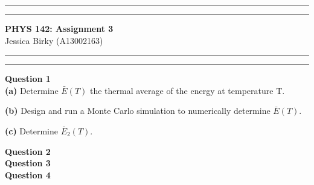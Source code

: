 \documentclass{article}
\newcommand{\mytitle}{PHYS 142: Assignment 3}
\begin{document}
\hrule \vspace{1pt} \hrule 
\begin{center}\Large \textbf{\sc \mytitle} \\
\normalsize \sc Jessica Birky (A13002163)
\end{center}
\hrule \vspace{1pt} \hrule 


\bigskip
\textbf{Question 1} \\

\textbf{(a)} Determine $\bar{E}(T)$ the thermal average of the energy at temperature T.

\textbf{(b)} Design and run a Monte Carlo simulation to numerically determine $\bar{E}(T)$.

\textbf{(c)} Determine $\bar{E}_{2}(T)$.


\bigskip
\textbf{Question 2} \\



\bigskip
\textbf{Question 3} \\



\bigskip
\textbf{Question 4} \\
\end{document}
